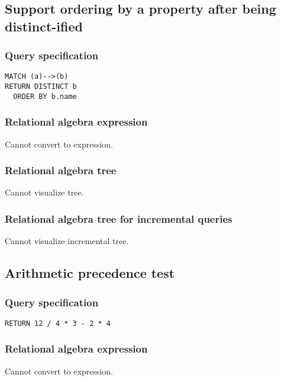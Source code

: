 \subsection{Support ordering by a property after being distinct-ified}

\subsubsection*{Query specification}

\begin{lstlisting}
MATCH (a)-->(b)
RETURN DISTINCT b
  ORDER BY b.name
\end{lstlisting}

\subsubsection*{Relational algebra expression}

Cannot convert to expression.

\subsubsection*{Relational algebra tree}

Cannot visualize tree.

\subsubsection*{Relational algebra tree for incremental queries}

Cannot visualize incremental tree.

\subsection{Arithmetic precedence test}

\subsubsection*{Query specification}

\begin{lstlisting}
RETURN 12 / 4 * 3 - 2 * 4
\end{lstlisting}

\subsubsection*{Relational algebra expression}

Cannot convert to expression.

